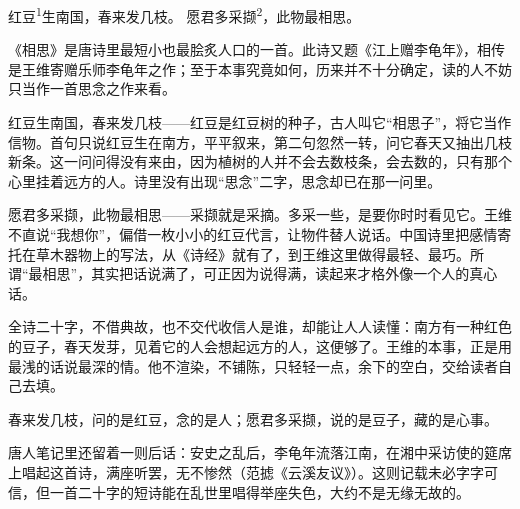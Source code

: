 
\begin{poem}
红豆\textsuperscript{1}生南国，春来发几枝。
愿君多采撷\textsuperscript{2}，此物最相思。
\end{poem}

\begin{annotations}
\end{annotations}

\begin{appreciation}
《相思》是唐诗里最短小也最脍炙人口的一首。此诗又题《江上赠李龟年》，相传是王维寄赠乐师李龟年之作；至于本事究竟如何，历来并不十分确定，读的人不妨只当作一首思念之作来看。

红豆生南国，春来发几枝——红豆是红豆树的种子，古人叫它“相思子”，将它当作信物。首句只说红豆生在南方，平平叙来，第二句忽然一转，问它春天又抽出几枝新条。这一问问得没有来由，因为植树的人并不会去数枝条，会去数的，只有那个心里挂着远方的人。诗里没有出现“思念”二字，思念却已在那一问里。

愿君多采撷，此物最相思——采撷就是采摘。多采一些，是要你时时看见它。王维不直说“我想你”，偏借一枚小小的红豆代言，让物件替人说话。中国诗里把感情寄托在草木器物上的写法，从《诗经》就有了，到王维这里做得最轻、最巧。所谓“最相思”，其实把话说满了，可正因为说得满，读起来才格外像一个人的真心话。

全诗二十字，不借典故，也不交代收信人是谁，却能让人人读懂：南方有一种红色的豆子，春天发芽，见着它的人会想起远方的人，这便够了。王维的本事，正是用最浅的话说最深的情。他不渲染，不铺陈，只轻轻一点，余下的空白，交给读者自己去填。

春来发几枝，问的是红豆，念的是人；愿君多采撷，说的是豆子，藏的是心事。

唐人笔记里还留着一则后话：安史之乱后，李龟年流落江南，在湘中采访使的筵席上唱起这首诗，满座听罢，无不惨然（范摅《云溪友议》）。这则记载未必字字可信，但一首二十字的短诗能在乱世里唱得举座失色，大约不是无缘无故的。
\end{appreciation}
